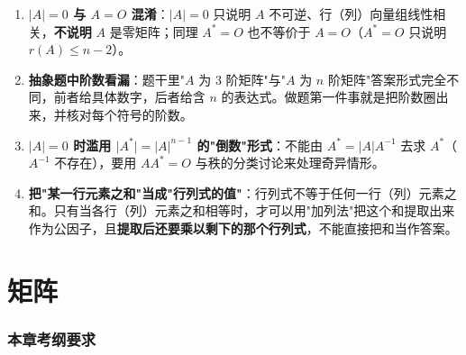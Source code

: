 \documentclass[11pt,openany,UTF8]{ctexbook}
\begin{document}
\begin{enumerate}
\item \textbf{$\vert A\vert=0$ 与 $A=O$ 混淆}：$\vert A\vert=0$ 只说明 $A$ 不可逆、行（列）向量组线性相关，\textbf{不说明} $A$ 是零矩阵；同理 $A^*=O$ 也不等价于 $A=O$（$A^*=O$ 只说明 $r(A)\le n-2$）。
\item \textbf{抽象题中阶数看漏}：题干里"$A$ 为 $3$ 阶矩阵"与"$A$ 为 $n$ 阶矩阵"答案形式完全不同，前者给具体数字，后者给含 $n$ 的表达式。做题第一件事就是把阶数圈出来，并核对每个符号的阶数。
\item \textbf{$\vert A\vert=0$ 时滥用 $\vert A^*\vert=\vert A\vert^{n-1}$ 的"倒数"形式}：不能由 $A^*=\vert A\vert A^{-1}$ 去求 $A^*$（$A^{-1}$ 不存在），要用 $AA^*=O$ 与秩的分类讨论来处理奇异情形。
\item \textbf{把"某一行元素之和"当成"行列式的值"}：行列式不等于任何一行（列）元素之和。只有当各行（列）元素之和相等时，才可以用"加列法"把这个和提取出来作为公因子，且\textbf{提取后还要乘以剩下的那个行列式}，不能直接把和当作答案。
\end{enumerate}
\chapter{矩阵}
\subsection*{本章考纲要求}
\end{document}
